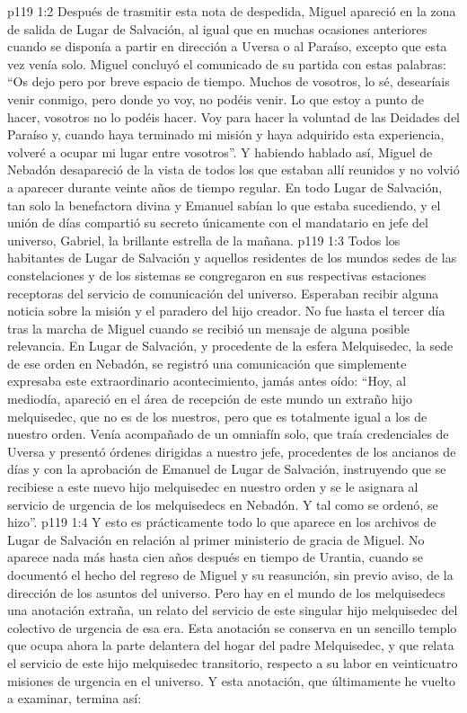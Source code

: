 \vs p119 1:2 Después de trasmitir esta nota de despedida, Miguel apareció en la zona de salida de Lugar de Salvación, al igual que en muchas ocasiones anteriores cuando se disponía a partir en dirección a Uversa o al Paraíso, excepto que esta vez venía solo. Miguel concluyó el comunicado de su partida con estas palabras: “Os dejo pero por breve espacio de tiempo. Muchos de vosotros, lo sé, desearíais venir conmigo, pero donde yo voy, no podéis venir. Lo que estoy a punto de hacer, vosotros no lo podéis hacer. Voy para hacer la voluntad de las Deidades del Paraíso y, cuando haya terminado mi misión y haya adquirido esta experiencia, volveré a ocupar mi lugar entre vosotros”. Y habiendo hablado así, Miguel de Nebadón desapareció de la vista de todos los que estaban allí reunidos y no volvió a aparecer durante veinte años de tiempo regular. En todo Lugar de Salvación, tan solo la benefactora divina y Emanuel sabían lo que estaba sucediendo, y el unión de días compartió su secreto únicamente con el mandatario en jefe del universo, Gabriel, la brillante estrella de la mañana.
\vs p119 1:3 Todos los habitantes de Lugar de Salvación y aquellos residentes de los mundos sedes de las constelaciones y de los sistemas se congregaron en sus respectivas estaciones receptoras del servicio de comunicación del universo. Esperaban recibir alguna noticia sobre la misión y el paradero del hijo creador. No fue hasta el tercer día tras la marcha de Miguel cuando se recibió un mensaje de alguna posible relevancia. En Lugar de Salvación, y procedente de la esfera Melquisedec, la sede de ese orden en Nebadón, se registró una comunicación que simplemente expresaba este extraordinario acontecimiento, jamás antes oído: “Hoy, al mediodía, apareció en el área de recepción de este mundo un extraño hijo melquisedec, que no es de los nuestros, pero que es totalmente igual a los de nuestro orden. Venía acompañado de un omniafín solo, que traía credenciales de Uversa y presentó órdenes dirigidas a nuestro jefe, procedentes de los ancianos de días y con la aprobación de Emanuel de Lugar de Salvación, instruyendo que se recibiese a este nuevo hijo melquisedec en nuestro orden y se le asignara al servicio de urgencia de los melquisedecs en Nebadón. Y tal como se ordenó, se hizo”.
\vs p119 1:4 Y esto es prácticamente todo lo que aparece en los archivos de Lugar de Salvación en relación al primer ministerio de gracia de Miguel. No aparece nada más hasta cien años después en tiempo de Urantia, cuando se documentó el hecho del regreso de Miguel y su reasunción, sin previo aviso, de la dirección de los asuntos del universo. Pero hay en el mundo de los melquisedecs una anotación extraña, un relato del servicio de este singular hijo melquisedec del colectivo de urgencia de esa era. Esta anotación se conserva en un sencillo templo que ocupa ahora la parte delantera del hogar del padre Melquisedec, y que relata el servicio de este hijo melquisedec transitorio, respecto a su labor en veinticuatro misiones de urgencia en el universo. Y esta anotación, que últimamente he vuelto a examinar, termina así:
